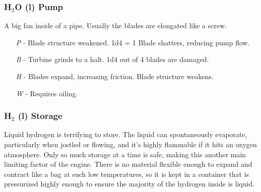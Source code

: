 \documentclass[a4paper]{article}
\begin{document}
\vspace{-0.5cm} \hspace{-18pt} \subsubsection{H$_2$O (l) Pump} \label{engine_h2o_pump} \vspace{-0.2cm}
A big fan inside of a pipe. Usually the blades are elongated like a screw.
\begin{enumerate}
\item [\textit{P}] - Blade structure weakened. 1d4 = 1 Blade shatters, reducing pump flow.
\item [\textit{B}] - Turbine grinds to a halt. 1d4 out of 4 blades are damaged.
\item [\textit{H}] - Blades expand, increasing friction. Blade structure weakens.
\item [\textit{W}] - Requires oiling. 
\end{enumerate}


\vspace{-0.5cm} \hspace{-18pt} \subsubsection{H$_2$ (l) Storage} \label{engine_h2_storage} \vspace{-0.2cm}
Liquid hydrogen is terrifying to store. The liquid can spontaneously evaporate, particularly when jostled or flowing, and it's highly flammable if it hits an oxygen atmosphere. Only so much storage at a time is safe, making this another main limiting factor of the engine. There is no material flexible enough to expand and contract like a bag at such low temperatures, so it is kept in a container that is pressurized highly enough to ensure the majority of the hydrogen inside is liquid.
\end{document}
